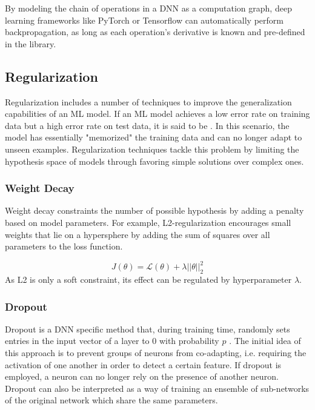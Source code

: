 By modeling the chain of operations in a DNN as a computation graph, deep learning frameworks like PyTorch \cite{NEURIPS2019_9015} or Tensorflow \cite{tensorflow2015-whitepaper} can automatically perform backpropagation, as long as each operation's derivative is known and pre-defined in the library.

\subsection{Regularization}
Regularization includes a number of techniques to improve the generalization capabilities of an ML model. If an ML model achieves a low error rate on training data but a high error rate on test data, it is said to be . In this scenario, the model has essentially "memorized" the training data and can no longer adapt to unseen examples. Regularization techniques tackle this problem by limiting the hypothesis space of models through favoring simple solutions over complex ones.

\subsubsection{Weight Decay}
Weight decay constraints the number of possible hypothesis by adding a penalty based on model parameters. For example, L2-regularization encourages small weights that lie on a hypersphere by adding the sum of squares over all parameters to the loss function.

\begin{equation}
    J(\theta) = \mathcal{L}(\theta) + \lambda ||\theta||_2^2
\end{equation}
As L2 is only a soft constraint, its effect can be regulated by hyperparameter $\lambda$.

\subsubsection{Dropout}
Dropout is a DNN specific method that, during training time, randomly sets entries in the input vector of a layer to $0$ with probability $p$ \cite{DBLP:journals/corr/abs-1207-0580}. The initial idea of this approach is to prevent groups of neurons from co-adapting, i.e. requiring the activation of one another in order to detect a certain feature. If dropout is employed, a neuron can no longer rely on the presence of another neuron. Dropout can also be interpreted as a way of training an ensemble of sub-networks of the original network which share the same parameters.


